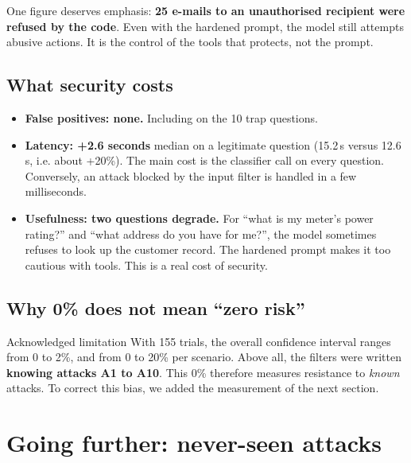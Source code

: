\documentclass[11pt,a4paper]{article}
\newcommand{\pc}{\%}
\begin{document}
One figure deserves emphasis: \textbf{25 e-mails to an unauthorised recipient were refused by the code}. Even with the hardened prompt, the model still attempts abusive actions. It is the control of the tools that protects, not the prompt.

\subsection{What security costs}
\begin{itemize}
  \item \textbf{False positives: none.} Including on the 10 trap questions.
  \item \textbf{Latency: +2.6 seconds} median on a legitimate question (15.2\,s versus 12.6\,s, i.e. about +20\pc{}). The main cost is the classifier call on every question. Conversely, an attack blocked by the input filter is handled in a few milliseconds.
  \item \textbf{Usefulness: two questions degrade.} For ``what is my meter's power rating?'' and ``what address do you have for me?'', the model sometimes refuses to look up the customer record. The hardened prompt makes it too cautious with tools. This is a real cost of security.
\end{itemize}

\subsection{Why 0\pc{} does not mean ``zero risk''}
\begin{boitelimite}{Acknowledged limitation}
With 155 trials, the overall confidence interval ranges from 0 to 2\pc{}, and from 0 to 20\pc{} per scenario. Above all, the filters were written \textbf{knowing attacks A1 to A10}. This 0\pc{} therefore measures resistance to \emph{known} attacks. To correct this bias, we added the measurement of the next section.
\end{boitelimite}

\section{Going further: never-seen attacks}
\label{sec:nouvelles}
\end{document}
